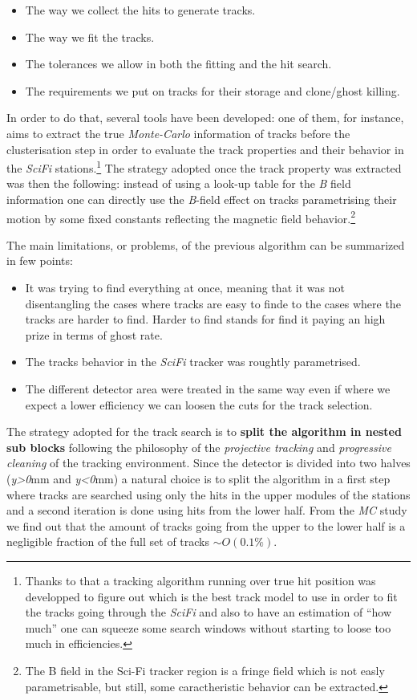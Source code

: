 \documentclass[paper=a4, fontsize=10pt]{scrartcl}
\numberwithin{equation}{section}		%
\numberwithin{figure}{section}			%
\numberwithin{table}{section}				%
\begin{document}
\begin{itemize}
\item{The way we collect the hits to generate tracks.}
\item{The way we fit the tracks.}
\item{The tolerances we allow in both the fitting and the hit search.}
\item{The requirements we put on tracks for their storage and clone/ghost killing.}
\end{itemize}

In order to do that, several tools have been developed: one of them, for instance, aims to extract the true \textit{Monte-Carlo} information of tracks before the clusterisation step in order to evaluate the track properties and their behavior in the \textit{SciFi} stations.\footnote{Thanks to that a tracking algorithm running over true hit position was developped to figure out which is the best track model to use in order to fit the tracks going through the \textit{SciFi} and also to have an estimation of ``how much'' one can squeeze some search windows without starting to loose too much in efficiencies.} The strategy adopted once the track property was extracted was then the following: instead of using a look-up table for the \textit{B} field information one can directly use the \textit{B}-field effect on tracks parametrising their motion by some fixed constants reflecting the magnetic field behavior.\footnote{The B field in the Sci-Fi tracker region is a fringe field which is not easly parametrisable, but still, some caractheristic behavior can be extracted.}

The main limitations, or problems, of the previous algorithm can be summarized in few points:
\begin{itemize} 
\item{It was trying to find everything at once, meaning that it was not disentangling the cases where tracks are easy to finde to the cases where the tracks are harder to find. Harder to find stands for find it paying an high prize in terms of ghost rate.}
\item{The tracks behavior in the \textit{SciFi} tracker was roughtly parametrised.} 
\item{The different detector area were treated in the same way even if where we expect a lower efficiency we can loosen the cuts for the track selection.}
\end{itemize}

The strategy adopted for the track search is to \textbf{split the algorithm in nested sub blocks} following the philosophy of the \textit{projective tracking} and \textit{progressive cleaning} of the tracking environment. Since the detector is divided into two halves (\textit{y>0}mm and \textit{y<0}mm) a natural choice is to split the algorithm in a first step where tracks are searched using only the hits in the upper modules of the stations and a second iteration is done using hits from the lower half. 
From the \textit{MC} study we find out that the amount of tracks going from the upper to the lower half is a negligible fraction of the full set of tracks \textit{$\sim O(0.1 \%)$}. 
\end{document}
